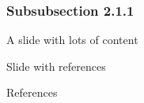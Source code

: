 \documentclass[12pt, t]{beamer}
\begin{document}
\subsubsection{Subsubsection 2.1.1}

\begin{frame}{A slide with lots of content}
    \lipsum[2]
\end{frame}


\begin{frame}{Slide with references}
	\centering \cite{upper1974unsuccessful, didden2007multisite}
\end{frame}

\begin{frame}[allowframebreaks]{References}
\end{frame}
\end{document}

